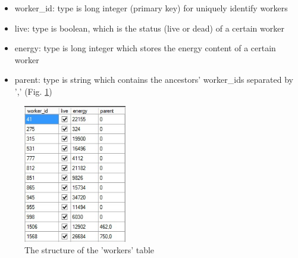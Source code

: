 \documentclass[a4paper,12pt]{article}
\begin{document}
\begin{itemize}
	\item worker\_id: type is long integer (primary key) for uniquely identify workers
	\item live: type is boolean, which is the status (live or dead) of a certain worker
	\item energy: type is long integer which stores the energy content of a certain worker
	\item parent: type is string which contains the ancestors' worker\_ids separated by ',' (Fig. \ref{fig:tabworkers})
\end{itemize}
 
\begin{figure}
	\begin{center}
		\includegraphics[width=4.5cm]{tabworkers.jpg}
		\caption{The structure of the 'workers' table}
		\label{fig:tabworkers}
	\end{center}
\end{figure}
\end{document}
